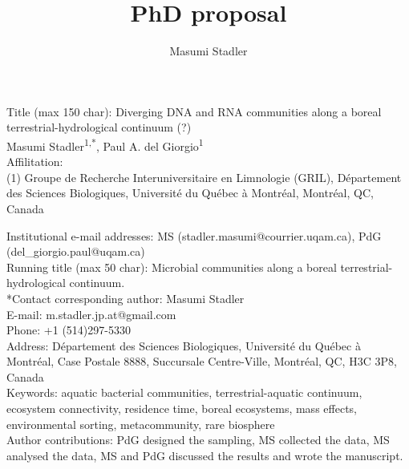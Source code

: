 \documentclass[12pt,a4paper]{article} %
\author{Masumi Stadler}
\title{PhD proposal}
\begin{document}

\setlength{\parindent}{0cm}
Title (max 150 char): Diverging DNA and RNA communities along a boreal terrestrial-hydrological continuum (?) \\

Masumi Stadler\textsuperscript{1,*}, Paul A. del Giorgio\textsuperscript{1}\\

Affilitation:\\
(1) Groupe de Recherche Interuniversitaire en Limnologie (GRIL), Département des Sciences Biologiques, Université du Québec à Montréal, Montréal, QC, Canada


Institutional e-mail addresses: MS (stadler.masumi@courrier.uqam.ca), PdG (del\_giorgio.paul@uqam.ca)\\

Running title (max 50 char): Microbial communities along a boreal terrestrial-hydrological continuum.\\

*Contact corresponding author: Masumi Stadler \\
E-mail: m.stadler.jp.at@gmail.com \\
Phone: +1 (514)297-5330 \\
Address: Département des Sciences Biologiques, Université du Québec à Montréal, Case Postale 8888, Succursale Centre-Ville, Montréal, QC, H3C 3P8, Canada \\

Keywords: aquatic bacterial communities, terrestrial-aquatic continuum, ecosystem connectivity, residence time, boreal ecosystems, mass effects, environmental sorting, metacommunity, rare biosphere\\

Author contributions: PdG designed the sampling, MS collected the data, MS analysed the data, MS and PdG discussed the results and wrote the manuscript.\\

\newpage

\doublespacing





\setlength{\parindent}{1cm}
\end{document}
